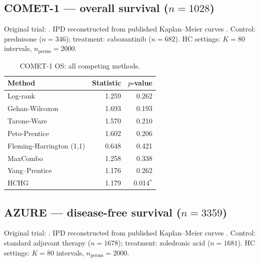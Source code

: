 \documentclass[11pt]{article}
\newcommand{\sig}{$^{\ast}$}
\begin{document}
\subsection*{COMET-1 --- overall survival ($n=1028$)}

Original trial: \citet{smith2016}.
IPD reconstructed from published Kaplan--Meier curves
\citep{guyot2012}.
Control: prednisone ($n=346$); treatment: cabozantinib ($n=682$).
HC settings: $K=80$ intervals, $n_\mathrm{perms}=2000$.

\begin{table}[h]
  \centering
  \caption{COMET-1 OS: all competing methods.}
  \label{tab:comet}
  \begin{tabular}{@{}lrr@{}}
    \toprule
    Method & Statistic & $p$-value \\
    \midrule
    Log-rank                         &  1.259 & 0.262 \\
    Gehan-Wilcoxon                   &  1.693 & 0.193 \\
    Tarone-Ware                      &  1.570 & 0.210 \\
    Peto-Prentice                    &  1.602 & 0.206 \\
    Fleming-Harrington (1,1)         &  0.648 & 0.421 \\
    MaxCombo                         &  1.258 & 0.338 \\
    Yang--Prentice                   &  1.176 & 0.262 \\
    HCHG                             &  1.179 & 0.014\sig \\
    \bottomrule
  \end{tabular}
\end{table}

\subsection*{AZURE --- disease-free survival ($n=3359$)}

Original trial: \citet{coleman2011,coleman2014}.
IPD reconstructed from published Kaplan--Meier curves
\citep{guyot2012}.
Control: standard adjuvant therapy ($n=1678$); treatment: zoledronic acid
($n=1681$).  HC settings: $K=80$ intervals, $n_\mathrm{perms}=2000$.
\end{document}
